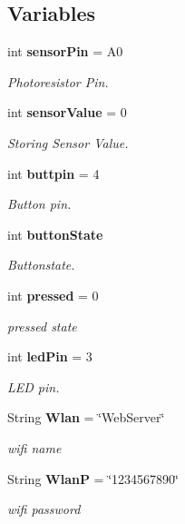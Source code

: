 \subsection*{Variables}
\begin{CompactItemize}
\item 
int {\bf sensor\-Pin} = A0
\begin{CompactList}\small\item\em Photoresistor Pin. \item\end{CompactList}\item 
int {\bf sensor\-Value} = 0
\begin{CompactList}\small\item\em Storing Sensor Value. \item\end{CompactList}\item 
int {\bf buttpin} = 4
\begin{CompactList}\small\item\em Button pin. \item\end{CompactList}\item 
int {\bf button\-State}
\begin{CompactList}\small\item\em Buttonstate. \item\end{CompactList}\item 
int {\bf pressed} = 0
\begin{CompactList}\small\item\em pressed state \item\end{CompactList}\item 
int {\bf led\-Pin} = 3
\begin{CompactList}\small\item\em LED pin. \item\end{CompactList}\item 
String {\bf Wlan} = \char`\"{}Web\-Server\char`\"{}
\begin{CompactList}\small\item\em wifi name \item\end{CompactList}\item 
String {\bf Wlan\-P} = \char`\"{}1234567890\char`\"{}
\begin{CompactList}\small\item\em wifi password \item\end{CompactList}\item 

\end{CompactItemize}
